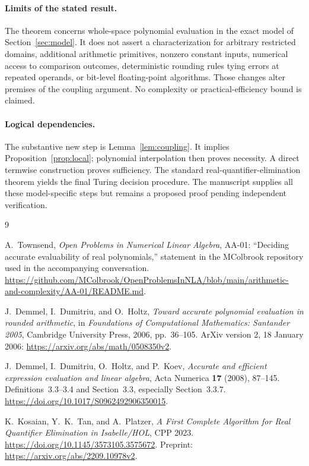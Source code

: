 \documentclass[11pt,a4paper]{article}
\numberwithin{equation}{section}
\theoremstyle{definition}
\theoremstyle{remark}
\begin{document}
\paragraph{Limits of the stated result.}
The theorem concerns whole-space polynomial evaluation in the exact model
of Section~\ref{sec:model}.  It does not assert a characterization for
arbitrary restricted domains, additional arithmetic primitives, nonzero
constant inputs, numerical access to comparison outcomes, deterministic
rounding rules tying errors at repeated operands, or bit-level
floating-point algorithms.  Those changes alter premises of the coupling
argument.  No complexity or practical-efficiency bound is claimed.

\paragraph{Logical dependencies.}
The substantive new step is Lemma~\ref{lem:coupling}.  It implies
Proposition~\ref{prop:local}; polynomial interpolation then proves
necessity.  A direct termwise construction proves sufficiency.  The
standard real-quantifier-elimination theorem yields the final Turing
decision procedure.  The manuscript supplies all these model-specific
steps but remains a proposed proof pending independent verification.

\begin{thebibliography}{9}

A.~Townsend,
\emph{Open Problems in Numerical Linear Algebra},
AA-01: ``Deciding accurate evaluability of real polynomials,''
statement in the MColbrook repository used in the accompanying
conversation.
\url{https://github.com/MColbrook/OpenProblemsInNLA/blob/main/arithmetic-and-complexity/AA-01/README.md}.

J.~Demmel, I.~Dumitriu, and O.~Holtz,
\emph{Toward accurate polynomial evaluation in rounded arithmetic},
in \emph{Foundations of Computational Mathematics: Santander 2005},
Cambridge University Press, 2006, pp.~36--105.
ArXiv version 2, 18 January 2006:
\url{https://arxiv.org/abs/math/0508350v2}.

J.~Demmel, I.~Dumitriu, O.~Holtz, and P.~Koev,
\emph{Accurate and efficient expression evaluation and linear algebra},
Acta Numerica \textbf{17} (2008), 87--145.
Definitions~3.3--3.4 and Section~3.3, especially Section~3.3.7.
\url{https://doi.org/10.1017/S0962492906350015}.

K.~Kosaian, Y.~K.~Tan, and A.~Platzer,
\emph{A First Complete Algorithm for Real Quantifier Elimination in
Isabelle/HOL},
CPP 2023.
\url{https://doi.org/10.1145/3573105.3575672}.
Preprint:
\url{https://arxiv.org/abs/2209.10978v2}.

\end{thebibliography}
\end{document}
